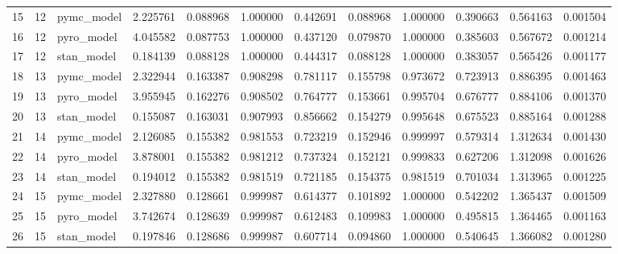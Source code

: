 \begin{tabular}{lrlrrrrrrrrr}
15 & 12 & pymc_model & 2.225761 & 0.088968 & 1.000000 & 0.442691 & 0.088968 & 1.000000 & 0.390663 & 0.564163 & 0.001504 \\
16 & 12 & pyro_model & 4.045582 & 0.087753 & 1.000000 & 0.437120 & 0.079870 & 1.000000 & 0.385603 & 0.567672 & 0.001214 \\
17 & 12 & stan_model & 0.184139 & 0.088128 & 1.000000 & 0.444317 & 0.088128 & 1.000000 & 0.383057 & 0.565426 & 0.001177 \\
18 & 13 & pymc_model & 2.322944 & 0.163387 & 0.908298 & 0.781117 & 0.155798 & 0.973672 & 0.723913 & 0.886395 & 0.001463 \\
19 & 13 & pyro_model & 3.955945 & 0.162276 & 0.908502 & 0.764777 & 0.153661 & 0.995704 & 0.676777 & 0.884106 & 0.001370 \\
20 & 13 & stan_model & 0.155087 & 0.163031 & 0.907993 & 0.856662 & 0.154279 & 0.995648 & 0.675523 & 0.885164 & 0.001288 \\
21 & 14 & pymc_model & 2.126085 & 0.155382 & 0.981553 & 0.723219 & 0.152946 & 0.999997 & 0.579314 & 1.312634 & 0.001430 \\
22 & 14 & pyro_model & 3.878001 & 0.155382 & 0.981212 & 0.737324 & 0.152121 & 0.999833 & 0.627206 & 1.312098 & 0.001626 \\
23 & 14 & stan_model & 0.194012 & 0.155382 & 0.981519 & 0.721185 & 0.154375 & 0.981519 & 0.701034 & 1.313965 & 0.001225 \\
24 & 15 & pymc_model & 2.327880 & 0.128661 & 0.999987 & 0.614377 & 0.101892 & 1.000000 & 0.542202 & 1.365437 & 0.001509 \\
25 & 15 & pyro_model & 3.742674 & 0.128639 & 0.999987 & 0.612483 & 0.109983 & 1.000000 & 0.495815 & 1.364465 & 0.001163 \\
26 & 15 & stan_model & 0.197846 & 0.128686 & 0.999987 & 0.607714 & 0.094860 & 1.000000 & 0.540645 & 1.366082 & 0.001280 \\
\bottomrule
\end{tabular}
